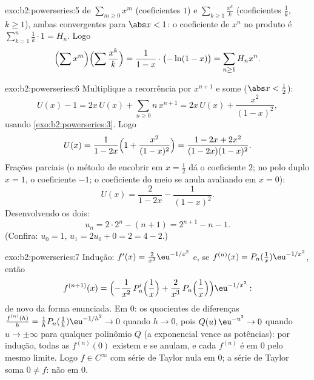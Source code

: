 \begin{solution}{exo:b2:powerseries:5}
 de $\sum_{m \geq 0} x^m$ (coeficientes $1$) e
$\sum_{k\geq1} \frac{x^k}{k}$ (coeficientes $\frac1k$, $k \geq
1$), ambas  convergentes para $\abs x < 1$: o coeficiente
de $x^n$ no produto é $\sum_{k=1}^{n} \frac1k \cdot 1 = H_n$.
Logo
\[
\Bigl(\sum x^m\Bigr)\Bigl(\sum \frac{x^k}{k}\Bigr)
= \frac{1}{1-x}\cdot\bigl(-\ln(1-x)\bigr)
= \sum_{n\geq1} H_n x^n .
\]
\end{solution}

\begin{solution}{exo:b2:powerseries:6}
Multiplique a recorrência por $x^{n+1}$ e some ($\abs x <
\frac12$):
\[
U(x) - 1 = 2x\,U(x) + \sum_{n\geq0} n\,x^{n+1}
= 2x\,U(x) + \frac{x^2}{(1-x)^2} ,
\]
usando \cref{exo:b2:powerseries:3}. Logo
\[
U(x) = \frac{1}{1 - 2x}\Bigl(1 + \frac{x^2}{(1-x)^2}\Bigr)
= \frac{1 - 2x + 2x^2}{(1-2x)(1-x)^2} .
\]
Frações parciais (o método de encobrir em $x = \frac12$ dá o coeficiente $2$;
no polo duplo $x = 1$, o coeficiente $-1$; o coeficiente do meio
se anula avaliando em $x = 0$):
\[
U(x) = \frac{2}{1-2x} - \frac{1}{(1 - x)^2} .
\]
Desenvolvendo os dois:
\[
u_n = 2\cdot 2^n - (n + 1) = 2^{n+1} - n - 1 .
\]
(Confira: $u_0 = 1$, $u_1 = 2u_0 + 0 = 2 = 4 - 2$.)
\end{solution}

\begin{solution}{exo:b2:powerseries:7}
Indução: $f'(x) = \frac{2}{x^3}\eu^{-1/x^2}$ e, se $f^{(n)}(x)
= P_n(\tfrac1x)\eu^{-1/x^2}$, então
\[
f^{(n+1)}(x) =
\Bigl(-\frac{1}{x^2}\,P_n'\Bigl(\frac1x\Bigr) +
\frac{2}{x^3}\,P_n\Bigl(\frac1x\Bigr)\Bigr)\eu^{-1/x^2} :
\]
de novo da forma enunciada. Em $0$: os quocientes de diferenças $\frac{f^{(n)}(h)}{h} =
\frac1h P_n(\frac1h)\eu^{-1/h^2} \to 0$ quando $h \to 0$, pois
$Q(u)\,\eu^{-u^2} \to 0$ quando $u \to \pm\infty$ para qualquer polinômio
$Q$ (a exponencial vence as potências): por indução, todas as $f^{(n)}(0)$ existem
e se anulam, e cada $f^{(n)}$ é  em $0$ pelo mesmo
limite. Logo $f \in C^\infty$ com série de Taylor nula em $0$; a
série de Taylor soma $0 \neq f$: não  em $0$.
\end{solution}

